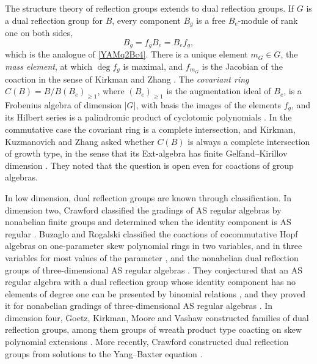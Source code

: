 \documentclass[reqno]{amsart}
\numberwithin{equation}{section}
\theoremstyle{definition}
\theoremstyle{remark}
\theoremstyle{plain}
\begin{document}
The structure theory of reflection groups extends to dual reflection groups. If $G$ is a dual reflection group for $B$, every component $B_g$ is a free $B_e$-module of rank one on both sides,
\begin{equation}\label{YAMq4De6}
B_g=f_gB_e=B_ef_g,
\end{equation}
which is the analogue of \eqref{YAMq2Bc4}. There is a unique element $m_G\in G$, the \emph{mass element}, at which $\deg f_g$ is maximal, and $f_{m_G}$ is the Jacobian of the coaction in the sense of Kirkman and Zhang \cite[Definition 2.1]{KZ}. The \emph{covariant ring} $C(B)=B/B(B_e)_{\ge1}$, where $(B_e)_{\ge1}$ is the augmentation ideal of $B_e$, is a Frobenius algebra of dimension $|G|$, with basis the images of the elements $f_g$, and its Hilbert series is a palindromic product of cyclotomic polynomials \cite[Theorems 0.3, 0.4 and 3.5]{KKZ}. In the commutative case the covariant ring is a complete intersection, and Kirkman, Kuzmanovich and Zhang asked whether $C(B)$ is always a complete intersection of growth type, in the sense that its Ext-algebra has finite Gelfand--Kirillov dimension \cite[Question 0.7]{KKZ}. They noted that the question is open even for coactions of group algebras.

In low dimension, dual reflection groups are known through classification. In dimension two, Crawford classified the gradings of AS regular algebras by nonabelian finite groups and determined when the identity component is AS regular \cite{Cra1}. Buzaglo and Rogalski classified the coactions of cocommutative Hopf algebras on one-parameter skew polynomial rings in two variables, and in three variables for most values of the parameter \cite{BR2}, and the nonabelian dual reflection groups of three-dimensional AS regular algebras \cite[Theorem 1.2]{BR}. They conjectured that an AS regular algebra with a dual reflection group whose identity component has no elements of degree one can be presented by binomial relations \cite[Conjecture 1.4]{BR}, and they proved it for nonabelian gradings of three-dimensional AS regular algebras \cite[Corollary 5.15]{BR}. In dimension four, Goetz, Kirkman, Moore and Vashaw constructed families of dual reflection groups, among them groups of wreath product type coacting on skew polynomial extensions \cite[Examples 2.1.6 and 2.1.7]{GKMV}. More recently, Crawford constructed dual reflection groups from solutions to the Yang--Baxter equation \cite{Cra2}.
\end{document}
